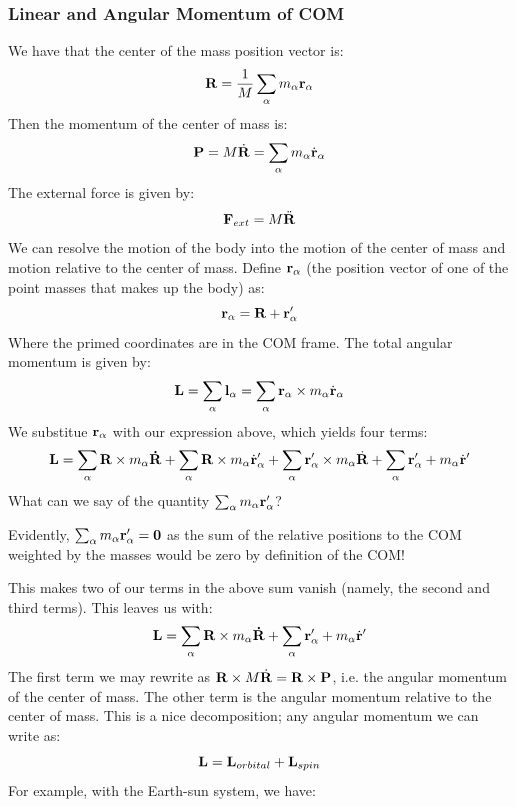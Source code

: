 \subsubsection{Linear and Angular Momentum of COM}
We have that the center of the mass position vector is:
\[\mathbf{R} = \frac{1}{M}\sum_{\alpha}m_\alpha\mathbf{r}_\alpha\]
Then the momentum of the center of mass is:
\[\mathbf{P} = M\dot{\mathbf{R}} = \sum_{\alpha}m_\alpha\dot{\mathbf{r}}_{\alpha}\]
The external force is given by:
\[\mathbf{F}_{ext} = M\ddot{\mathbf{R}}\]
We can resolve the motion of the body into the motion of the center of mass and motion relative to the center of mass. Define $\mathbf{r}_\alpha$ (the position vector of one of the point masses that makes up the body) as:
\[\mathbf{r}_\alpha = \mathbf{R} + \mathbf{r}_\alpha'\]
Where the primed coordinates are in the COM frame. The total angular momentum is given by:
\[\mathbf{L} = \sum_\alpha\mathbf{l}_\alpha = \sum_\alpha\mathbf{r}_\alpha \times m_\alpha \dot{\mathbf{r}}_\alpha\]
We substitue $\mathbf{r}_\alpha$ with our expression above, which yields four terms:
\[\mathbf{L} = \sum_\alpha \mathbf{R} \times m_\alpha\mathbf{\dot{R}} + \sum_\alpha \mathbf{R} \times m_\alpha\dot{\mathbf{r}}_\alpha' + \sum_\alpha \mathbf{r}_\alpha' \times m_\alpha \dot{\mathbf{R}} + \sum_\alpha \mathbf{r}_\alpha' + m_\alpha \dot{\mathbf{r}}'\]
What can we say of the quantity $\sum_\alpha m_\alpha\mathbf{r}_\alpha'$?
\begin{s}
Evidently, $\sum_\alpha m_\alpha\mathbf{r}_\alpha' = \mathbf{0}$ as the sum of the relative positions to the COM weighted by the masses would be zero by definition of the COM!
\end{s}
This makes two of our terms in the above sum vanish (namely, the second and third terms). This leaves us with:
\[\mathbf{L} = \sum_\alpha \mathbf{R} \times m_\alpha\mathbf{\dot{R}} + \sum_\alpha \mathbf{r}_\alpha' + m_\alpha \dot{\mathbf{r}}'\]
The first term we may rewrite as $\mathbf{R} \times M\dot{\mathbf{R}} = \mathbf{R} \times \mathbf{P}$, i.e. the angular momentum of the center of mass. The other term is the angular momentum relative to the center of mass. This is a nice decomposition; any angular momentum we can write as:
\[\mathbf{L} = \mathbf{L}_{orbital} + \mathbf{L}_{spin}\]
For example, with the Earth-sun system, we have:
